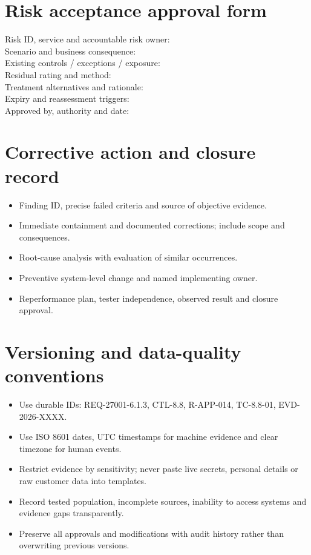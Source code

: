 \documentclass[11pt,letterpaper]{article}
\begin{document}
\section{Risk acceptance approval form}
\begin{tcolorbox}[title={Residual risk acceptance -- example fields},colback=pale,colframe=teal]
Risk ID, service and accountable risk owner: \hrulefill\\[4pt]
Scenario and business consequence: \hrulefill\\[4pt]
Existing controls / exceptions / exposure: \hrulefill\\[4pt]
Residual rating and method: \hrulefill\\[4pt]
Treatment alternatives and rationale: \hrulefill\\[4pt]
Expiry and reassessment triggers: \hrulefill\\[4pt]
Approved by, authority and date: \hrulefill
\end{tcolorbox}
\section{Corrective action and closure record}
\begin{itemize}
\item Finding ID, precise failed criteria and source of objective evidence.
\item Immediate containment and documented corrections; include scope and consequences.
\item Root-cause analysis with evaluation of similar occurrences.
\item Preventive system-level change and named implementing owner.
\item Reperformance plan, tester independence, observed result and closure approval.
\end{itemize}

\section{Versioning and data-quality conventions}
\begin{itemize}
\item Use durable IDs: REQ-27001-6.1.3, CTL-8.8, R-APP-014, TC-8.8-01, EVD-2026-XXXX.
\item Use ISO 8601 dates, UTC timestamps for machine evidence and clear timezone for human events.
\item Restrict evidence by sensitivity; never paste live secrets, personal details or raw customer data into templates.
\item Record tested population, incomplete sources, inability to access systems and evidence gaps transparently.
\item Preserve all approvals and modifications with audit history rather than overwriting previous versions.
\end{itemize}
\end{document}
